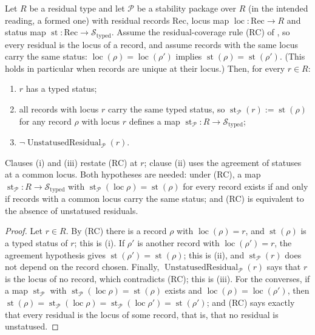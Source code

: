 \begin{theorem}\label{thm:F9}
Let \(R\) be a residual type and let \(\mathcal P\) be a stability package over
\(R\) (in the intended reading, a formed one) with residual records \(\mathrm{Rec}\), locus map
\(\operatorname{loc}:\mathrm{Rec}\to R\) and status map
\(\operatorname{st}:\mathrm{Rec}\to\mathcal S_{\mathrm{typed}}\). Assume
the residual-coverage rule (RC) of , so every residual is
the locus of a record, and assume records with the same locus carry the same
status: \(\operatorname{loc}(\rho)=\operatorname{loc}(\rho')\) implies
\(\operatorname{st}(\rho)=\operatorname{st}(\rho')\). (This holds in particular
when records are unique at their locus.) Then, for every \(r\in R\):
\begin{enumerate}[label=(\roman*)]
\item \(r\) has a typed status;
\item all records with locus \(r\) carry the same typed status, so
  \(\operatorname{st}_{\mathcal P}(r):=\operatorname{st}(\rho)\) for any
  record \(\rho\) with locus \(r\) defines a map
  \(\operatorname{st}_{\mathcal P}:R\to\mathcal S_{\mathrm{typed}}\);
\item \(\neg\operatorname{UnstatusedResidual}_{\mathcal P}(r)\).
\end{enumerate}
Clauses (i) and (iii) restate (RC) at \(r\); clause (ii) uses the agreement
of statuses at a common locus. Both hypotheses are needed: under (RC), a map
\(\operatorname{st}_{\mathcal P}:R\to\mathcal S_{\mathrm{typed}}\) with
\(\operatorname{st}_{\mathcal P}(\operatorname{loc}\rho)=\operatorname{st}(\rho)\)
for every record exists if and only if records with a common locus carry the
same status; and (RC) is equivalent to the absence of unstatused residuals.
\end{theorem}
\begin{proof}
Let \(r\in R\). By (RC) there is a record \(\rho\) with
\(\operatorname{loc}(\rho)=r\), and \(\operatorname{st}(\rho)\) is a typed
status of \(r\); this is (i). If \(\rho'\) is another record with
\(\operatorname{loc}(\rho')=r\), the agreement hypothesis gives
\(\operatorname{st}(\rho')=\operatorname{st}(\rho)\); this
is (ii), and \(\operatorname{st}_{\mathcal P}(r)\) does not depend on the
record chosen. Finally, \(\operatorname{UnstatusedResidual}_{\mathcal P}(r)\)
says that \(r\) is the locus of no record, which contradicts (RC); this is
(iii). For the converses, if a map \(\operatorname{st}_{\mathcal P}\) with
\(\operatorname{st}_{\mathcal P}(\operatorname{loc}\rho)=\operatorname{st}(\rho)\)
exists and \(\operatorname{loc}(\rho)=\operatorname{loc}(\rho')\), then
\(\operatorname{st}(\rho)=\operatorname{st}_{\mathcal P}(\operatorname{loc}\rho)
=\operatorname{st}_{\mathcal P}(\operatorname{loc}\rho')=\operatorname{st}(\rho')\);
and (RC) says exactly that every residual is the locus of some record, that is,
that no residual is unstatused.
\end{proof}

